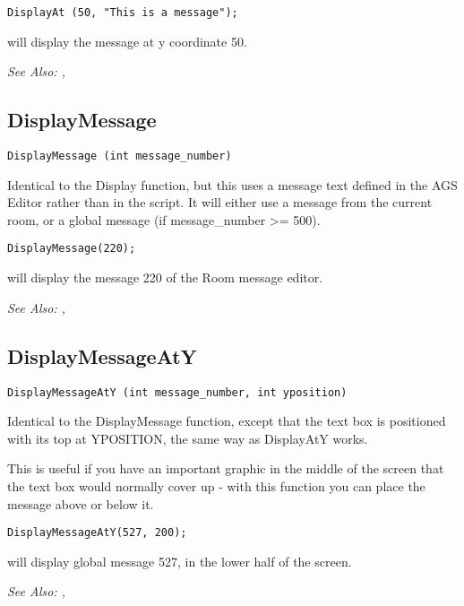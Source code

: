\begin{verbatim}
DisplayAt (50, "This is a message");
\end{verbatim}
will display the message at y coordinate 50.

\it{See Also:} , 

\subsection{DisplayMessage}\label{DisplayMessage}%

\begin{verbatim}
DisplayMessage (int message_number)
\end{verbatim}
Identical to the Display function, but this uses a message text defined in
the AGS Editor rather than in the script. It will either use a message
from the current room, or a global message (if message_number >= 500).

\begin{verbatim}
DisplayMessage(220);
\end{verbatim}
will display the message 220 of the Room message editor.

\it{See Also:} , 


\subsection{DisplayMessageAtY}\label{DisplayMessageAtY}%

\begin{verbatim}
DisplayMessageAtY (int message_number, int yposition)
\end{verbatim}
Identical to the DisplayMessage function, except that the text box
is positioned with its top at YPOSITION, the same way as DisplayAtY
works.

This is useful if you have an important graphic in the middle of the screen that
the text box would normally cover up - with this function you can place the message
above or below it.

\begin{verbatim}
DisplayMessageAtY(527, 200);
\end{verbatim}
will display global message 527, in the lower half of the screen.

\it{See Also:} , 



